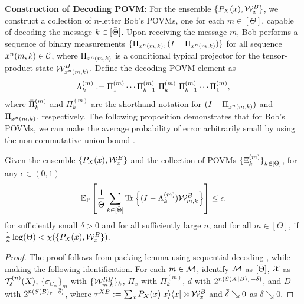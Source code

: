 \vspace{2pt}
\noindent\textbf{Construction of Decoding POVM}:
For the ensemble $\{P_X(x),\mathcal{W}^B_x\}$, we construct a collection of $n$-letter Bob's POVMs, one for each $m \in [\Theta]$, capable of decoding the message $k\in [\bar{\Theta}]$. 
Upon receiving the message $m$, Bob performs a sequence of binary measurements $\{\Pi_{x^n(m,k)},(I-\Pi_{x^n(m,k)})\}$ for all sequence $x^n(m,k) \in \mathcal{C}$, where $\Pi_{x^n(m,k)}$ is a conditional typical projector for the tensor-product state $\mathcal{W}^B_{x^n(m,k)}$.
Define the decoding POVM element as
$$\Lambda_{k}^{(m)} := \bar{\Pi}^{(m)}_{1} \cdots \bar{\Pi}^{(m)}_{k-1} \
\Pi^{(m)}_{k} \ \bar{\Pi}^{(m)}_{k-1} \cdots \bar{\Pi}^{(m)}_{1},$$
where $ \bar{\Pi}^{(m)}_{k}$ and $ \Pi^{(m)}_{k}$ are the shorthand notation for $(I-\Pi_{x^n(m,k)})$ and $\Pi_{x^n(m,k)}$, respectively.
The following proposition demonstrates that for Bob's POVMs, we can make the average probability of error arbitrarily small by using the non-commutative union bound \cite{sen2012achieving}.
\begin{prop}\label{prop:qc_packing}
    Given the ensemble $\{P_X(x),\mathcal{W}^B_x\}$ and the collection of POVMs $\{\Xi_{k}^{(m)}\}_{k\in[\bar{\Theta}]}$, for any $\epsilon \in (0,1)$
$$\mathbb{E}_{\mathbb{P}}\left[\frac{1}{\bar{\Theta}}\sum_{k\in[\bar{\Theta}]} \text{Tr}\left\{(I-\Lambda_{k}^{(m)})\mathcal{W}_{m,k}^B\right\}\right] \leq \epsilon,$$
for sufficiently small $\delta>0$ and for all sufficiently large $n$, and for all $m \in [\Theta]$, if $\frac{1}{n}\log(\bar{\Theta}) < \chi(\{P_X(x),\mathcal{W}^B_x\})$. 
\end{prop}
\begin{proof}
    The proof follows from packing lemma using sequential decoding \cite[Sec. 16.6]{wilde_arxivBook}, while making the following identification. For each $m\in\mathcal{M}$, identify $\mathcal{M}$ as $[\bar{\Theta}]$, $\mathcal{X}$ as $\mathcal{T}_{{\delta}}^{(n)}({X})$, $\{\sigma_{C_m}\}_m$ with $\{\mathcal{W}_{m,k}^{R B}\}_k$, $\Pi_x$ with $\Pi_{k}^{(m)}$, $d$ with $2^{n(S(X|B)_{\tau}-\Bar{\delta})}$, and $D$ with $2^{n(S(B)_\tau-\Bar{\delta})}$, where $\tau^{XB} := \sum_x P_X(x) |x\rangle\langle x|\otimes \mathcal{W}^B_x$ and $\Bar{\delta} \searrow 0$ as $\delta\searrow 0$. 
\end{proof}
